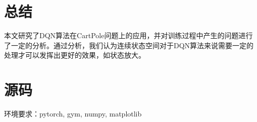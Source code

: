 \documentclass{article}
\begin{document}
    \section{总结}
        本文研究了DQN算法在CartPole问题上的应用，并对训练过程中产生的问题进行了一定的分析。通过分析，我们认为连续状态空间对于DQN算法来说需要一定的处理才可以发挥出更好的效果，如状态放大。

    
    \section{源码}
    环境要求：pytorch, gym, numpy, matplotlib
\end{document}
